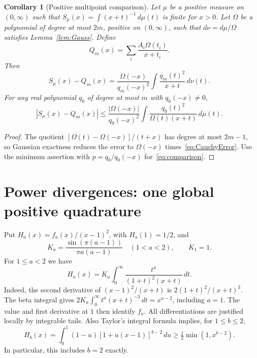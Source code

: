 \documentclass[11pt]{article}
\newtheorem{corollary}[theorem]{Corollary}
\numberwithin{equation}{section}
\begin{document}
\begin{corollary}[Positive multipoint comparison]\label{cor:comparison}
Let $\mu$ be a positive measure on $(0,\infty)$ such that
$S_\mu(x)=\int(x+t)^{-1}\,d\mu(t)$ is finite for $x>0$.
Let $\Omega$ be a polynomial of degree at most $2m$, positive on
$(0,\infty)$, such that $d\nu=d\mu/\Omega$ satisfies
Lemma~\ref{lem:Gauss}. Define
\begin{equation}\label{eq:rescaledGauss}
 Q_m(x)=\sum_i\frac{A_i\Omega(t_i)}{x+t_i}.
\end{equation}
Then
\begin{equation}\label{eq:multipoint}
 S_\mu(x)-Q_m(x)=\frac{\Omega(-x)}{q_m(-x)^2}
               \int\frac{q_m(t)^2}{x+t}\,d\nu(t).
\end{equation}
For any real polynomial $q_0$ of degree at most $m$ with $q_0(-x)\ne0$,
\begin{equation}\label{eq:comparison}
 |S_\mu(x)-Q_m(x)|\le\frac{|\Omega(-x)|}{q_0(-x)^2}
             \int\frac{q_0(t)^2}{\Omega(t)(x+t)}\,d\mu(t).
\end{equation}
\end{corollary}

\begin{proof}
The quotient $[\Omega(t)-\Omega(-x)]/(t+x)$ has degree at most
$2m-1$, so Gaussian exactness reduces the error to $\Omega(-x)$
times~\eqref{eq:CauchyError}. Use the minimum assertion with
$p=q_0/q_0(-x)$ for~\eqref{eq:comparison}.
\end{proof}

\section{Power divergences: one global positive quadrature}

Put $H_a(x)=f_a(x)/(x-1)^2$, with $H_a(1)=1/2$, and
\begin{equation}\label{eq:Ka}
 K_a=\frac{\sin(\pi(a-1))}{\pi a(a-1)}\quad(1<a<2),
 \qquad K_1=1.
\end{equation}
For $1\le a<2$ we have
\begin{equation}\label{eq:Hrepresentation}
 H_a(x)=K_a\int_0^\infty\frac{t^a}{(1+t)^2(x+t)}\,dt.
\end{equation}
Indeed, the second derivative of $(x-1)^2/(x+t)$ is
$2(1+t)^2/(x+t)^3$. The beta integral gives
$2K_a\int_0^\infty t^a(x+t)^{-3}\,dt=x^{a-2}$, including $a=1$.
The value and first derivative at $1$ then identify $f_a$.
All differentiations are justified locally by integrable tails.
Also Taylor's integral formula implies, for $1\le b\le2$,
\begin{equation}\label{eq:weight}
 H_b(x)=\int_0^1(1-u)[1+u(x-1)]^{b-2}\,du
       \ge\tfrac12\min(1,x^{b-2}).
\end{equation}
In particular, this includes $b=2$ exactly.
\end{document}
